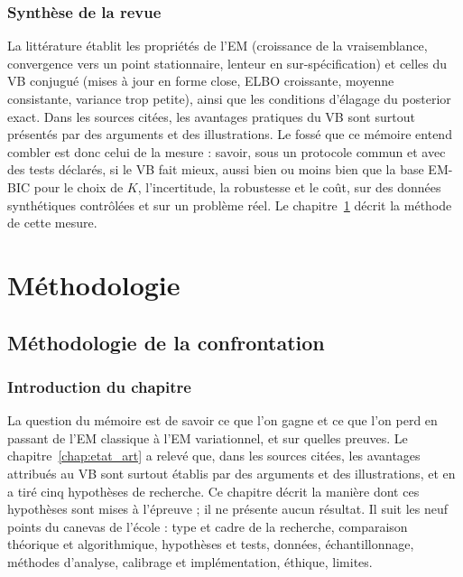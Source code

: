 \section{Synthèse de la revue}\label{sec:ea_synthese}
La littérature établit les propriétés de l'EM (croissance de la vraisemblance, convergence vers un point stationnaire, lenteur en sur-spécification) et celles du VB conjugué (mises à jour en forme close, ELBO croissante, moyenne consistante, variance trop petite), ainsi que les conditions d'élagage du posterior exact. Dans les sources citées, les avantages pratiques du VB sont surtout présentés par des arguments et des illustrations. Le fossé que ce mémoire entend combler est donc celui de la mesure : savoir, sous un protocole commun et avec des tests déclarés, si le VB fait mieux, aussi bien ou moins bien que la base EM-BIC pour le choix de $K$, l'incertitude, la robustesse et le coût, sur des données synthétiques contrôlées et sur un problème réel. Le chapitre~\ref{chap:methodologie} décrit la méthode de cette mesure.


\part{Méthodologie}

\chapter{Méthodologie de la confrontation}\label{chap:methodologie}
\section{Introduction du chapitre}\label{sec:intro_methodo}
La question du mémoire est de savoir ce que l'on gagne et ce que l'on perd en passant de l'EM classique à l'EM variationnel, et sur quelles preuves. Le chapitre~\ref{chap:etat_art} a relevé que, dans les sources citées, les avantages attribués au VB sont surtout établis par des arguments et des illustrations, et en a tiré cinq hypothèses de recherche. Ce chapitre décrit la manière dont ces hypothèses sont mises à l'épreuve ; il ne présente aucun résultat. Il suit les neuf points du canevas de l'école : type et cadre de la recherche, comparaison théorique et algorithmique, hypothèses et tests, données, échantillonnage, méthodes d'analyse, calibrage et implémentation, éthique, limites.

